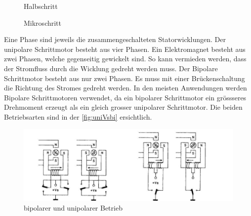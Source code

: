      \begin{figure}[H]
     	\centering
     	\caption{Halbschritt}
     	\label{fig:halbschritt}
     \end{figure}
    \begin{figure}[H]
    	\centering
    	\caption{Mikroschritt}
    	\label{fig:mikroschritt}
    \end{figure}
    Eine Phase sind jeweils die zusammengeschalteten Statorwicklungen. Der unipolare Schrittmotor besteht aus vier Phasen. Ein Elektromagnet besteht aus zwei Phasen, welche gegenseitig gewickelt sind. So kann vermieden werden, dass der Stromfluss durch die Wicklung gedreht werden muss. Der Bipolare Schrittmotor besteht aus nur zwei Phasen. Es muss mit einer Brückenschaltung die Richtung des Stromes gedreht werden. In den meisten Anwendungen werden Bipolare Schrittmotoren verwendet, da ein bipolarer Schrittmotor ein grössseres Drehmoment erzeugt als ein gleich grosser unipolarer Schrittmotor. Die beiden Betriebsarten sind in der \autoref{fig:uniVsbi} ersichtlich. 
    \begin{figure}[H]
       	\centering
       	\includegraphics[width=12cm]{src/Bilder/uniVsbi.JPG}
       	\caption{bipolarer und unipolarer Betrieb}
       	\label{fig:uniVsbi}
    \end{figure}
    
       
    
